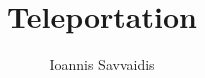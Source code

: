 \documentclass[12pt]{article}
\title{Teleportation }
\author{Ioannis Savvaidis}
\date{}
\begin{document}
\newenvironment{statement}[2][Statement]{\begin{trivlist}
\item[\hskip \labelsep {\bfseries #1}\hskip \labelsep {\bfseries #2.}]}{\end{trivlist}}

\maketitle


\vspace{10cm} %


\end{document}

